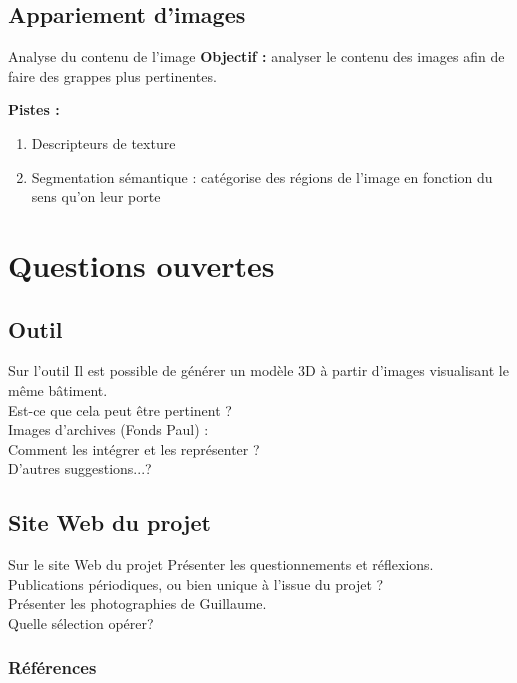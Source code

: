 \documentclass[10pt]{beamer}
\begin{document}
\subsection{Appariement d'images}
\begin{frame}{Analyse du contenu de l'image}
  \textbf{Objectif :} analyser le contenu des images afin de faire des grappes plus pertinentes.

  \textbf{Pistes :}
  \begin{enumerate}
  \item Descripteurs de texture
  \item Segmentation sémantique : catégorise des régions de l'image en fonction du sens qu'on leur porte
  \end{enumerate}

\end{frame}

\section{Questions ouvertes}
\subsection{Outil}
\begin{frame}{Sur l'outil}
  Il est possible de générer un modèle 3D à partir d'images visualisant le même bâtiment. \\
  \alert{Est-ce que cela peut être pertinent ?} \\[1cm]

  Images d'archives (Fonds Paul) : \\
  \alert{Comment les intégrer et les représenter ?}\\[1cm]
  
  \alert{D'autres suggestions...?}
\end{frame}

\subsection{Site Web du projet}
\begin{frame}{Sur le site Web du projet}
  Présenter les questionnements et réflexions. \\
  \alert{Publications périodiques, ou bien unique à l'issue du projet ?} \\[1cm]

  Présenter les photographies de Guillaume. \\
  \alert{Quelle sélection opérer?}
\end{frame}

 \begin{frame}[allowframebreaks]
  \frametitle{Références}
  
   \scriptsize{
     
   }
 \end{frame}

 
\end{document}
